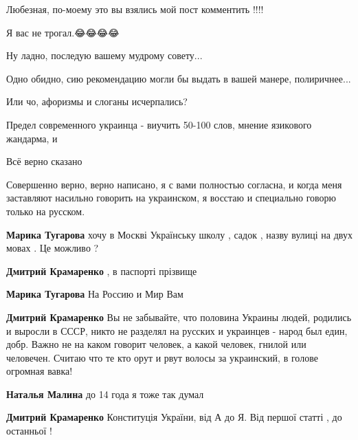 \begin{itemize}
\begin{itemize}
Любезная, по-моему это вы взялись мой пост комментить !!!!

Я вас не трогал.😂😂😂😂

Ну ладно, последую вашему мудрому совету...

Одно обидно, сию рекомендацию могли бы выдать в вашей манере, полиричнее...

Или чо, афоризмы и слоганы исчерпались?

\end{itemize}

Предел современного украинца - виучить 50-100 слов, мнение язикового жандарма, и

Всё верно сказано

Совершенно верно, верно написано, я с вами полностью согласна, и когда меня заставляют насильно говорить на украинском, я восстаю и специально говорю только на русском.

\begin{itemize}
\textbf{Марика Тугарова} хочу в Москві Українську школу , садок , назву вулиці на двух мовах . Це можливо ?

\textbf{Дмитрий Крамаренко} , в паспорті прізвище

\textbf{Марика Тугарова} На Россию и Мир Вам

\textbf{Дмитрий Крамаренко} Вы не забывайте, что половина Украины людей, родились и выросли в СССР, никто не разделял на русских и украинцев - народ был един, добр. Важно не на каком говорит человек, а какой человек, гнилой или человечен. Считаю что те кто орут и рвут волосы за украинский, в голове огромная вавка!

\textbf{Наталья Малина} до 14 года я тоже так думал

\textbf{Дмитрий Крамаренко} Конституція України, від А до Я. Від першої статті , до останньої !


\end{itemize}
\end{itemize}
